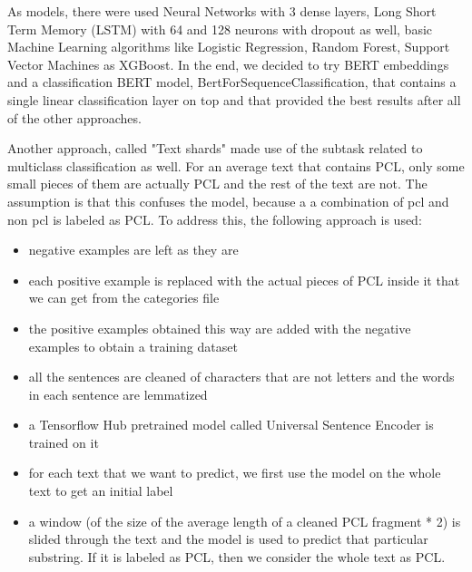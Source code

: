 \documentclass[11pt]{article}
\begin{document}
\begin{enumerate}
	      As models, there were used Neural Networks with 3 dense layers, Long Short
	      Term Memory (LSTM) with 64 and 128 neurons with dropout as well, basic
	      Machine Learning algorithms like Logistic Regression, Random Forest, Support
	      Vector Machines as XGBoost. In the end, we decided to try BERT embeddings
	      and a classification BERT model, BertForSequenceClassification, that
	      contains a single linear classification layer on top and that provided the
	      best results after all of the other approaches.

	      Another approach, called "Text shards" made use of the subtask related to
	      multiclass classification as well. For an average text that contains PCL,
	      only some small pieces of them are actually PCL and the rest of the text are
	      not. The assumption is that this confuses the model, because a a combination
	      of pcl and non pcl is labeled as PCL. To address this, the following
	      approach is used:

	      \begin{itemize}
		      \item negative examples are left as they are

		      \item each positive example is replaced with the actual pieces of PCL inside
		            it that we can get from the categories file

		      \item the positive examples obtained this way are added with the negative
		            examples to obtain a training dataset

		      \item all the sentences are cleaned of characters that are not letters and
		            the words in each sentence are lemmatized

		      \item a Tensorflow Hub pretrained model called Universal Sentence Encoder is
		            trained on it

		      \item for each text that we want to predict, we first use the model on the
		            whole text to get an initial label

		      \item a window (of the size of the average length of a cleaned PCL fragment
		            * 2) is slided through the text and the model is used to predict that
		            particular substring. If it is labeled as PCL, then we consider the whole
		            text as PCL.
	      \end{itemize}


\end{enumerate}
\end{document}

